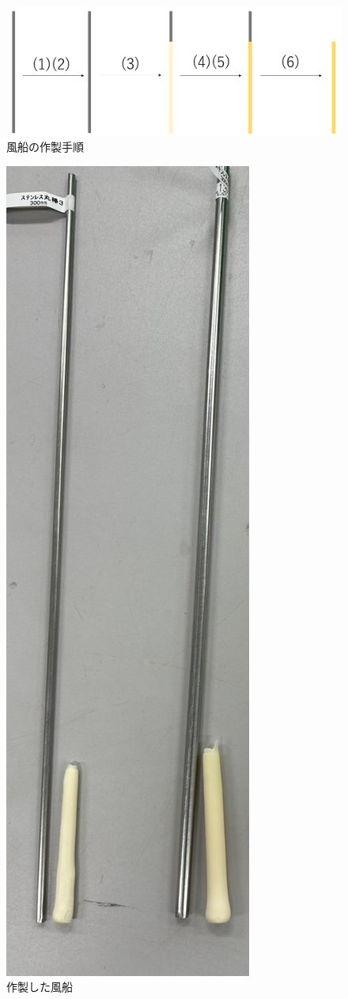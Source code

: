 \begin{figure}[!t]
  \centering  %
  \includegraphics[scale=0.3]{pic/tezyun.PNG}
  \caption{風船の作製手順}
\end{figure}
\begin{figure}[!t]
  \centering  %
  \includegraphics[scale=0.3]{pic/balloon.jpg}
  \caption{作製した風船}
\end{figure}


